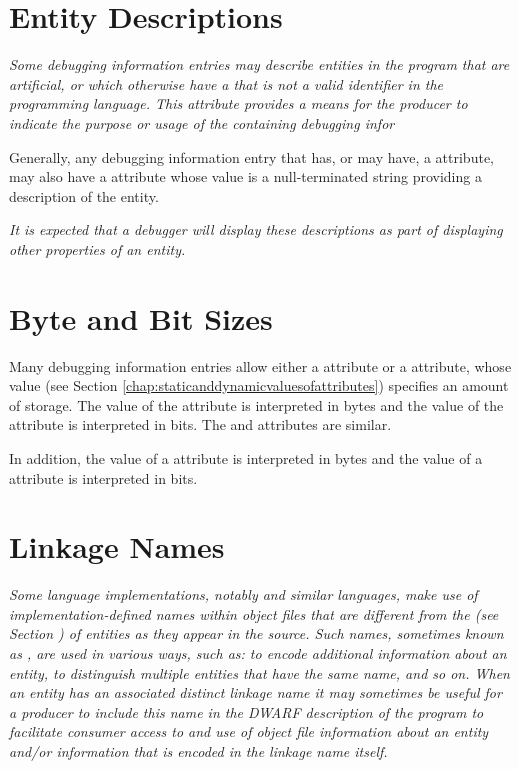 \section{Entity Descriptions}
\textit{Some debugging information entries may describe entities
in the program that are artificial, or which otherwise have a
 that is not a valid identifier in the
programming language.
This attribute provides a means for the producer to indicate
the purpose or usage of the containing debugging infor}

Generally, any debugging information entry that
has,\hypertarget{chap:DWATdescriptionartificialnameordescription}{}
or may have, a \DWATname{} attribute, may also have a
\DWATdescriptionDEFN{} attribute whose value is a
null-terminated string providing a description of the entity.

\textit{It is expected that a debugger will
display these descriptions as part of
displaying other properties of an entity.}

\section{Byte and Bit Sizes}
\label{chap:byteandbitsizes}
Many debugging information entries allow either a
\DWATbytesizeNAME{} attribute or a
\DWATbitsizeNAME{} attribute,
whose  value
(see Section \ref{chap:staticanddynamicvaluesofattributes})
specifies an
amount of storage. The value of the
\DWATbytesizeDEFN{} attribute
is interpreted in bytes and the value of the
\DWATbitsizeDEFN{}
attribute is interpreted in bits. The
\DWATstringlengthbytesize{} and
\DWATstringlengthbitsize{}
attributes are similar.

In addition, the 
value of a \DWATbytestride{} attribute is interpreted
in bytes and the  value of a
\DWATbitstride{}
attribute is interpreted in bits.

\section{Linkage Names}
\label{chap:linkagenames}
\textit{Some language implementations, notably
 and similar
languages, make use of implementation-defined names within
object files that are different from the 
(see Section ) of entities as they
appear in the source. Such names, sometimes known as
,
are used in various ways, such as: to encode additional
information about an entity, to distinguish multiple entities
that have the same name, and so on. When an entity has an
associated distinct linkage name it may sometimes be useful
for a producer to include this name in the DWARF description
of the program to facilitate consumer access to and use of
object file information about an entity and/or information
that is encoded in the linkage name itself.
}

